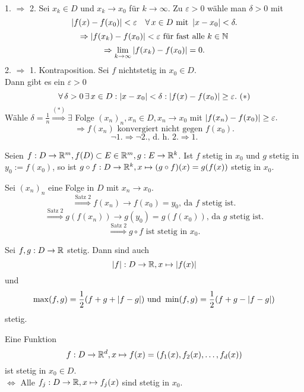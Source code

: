 \documentclass[../ana1.tex]{subfiles}
\begin{document}
\begin{bew}\leavevmode \\
    1. \(\Rightarrow \) 2. Sei \(x_k \in D \) und \( x_k 
    \rightarrow x_0 \) für \( k\rightarrow \infty \).
    Zu \( \varepsilon > 0 \) wähle man \( \delta > 0 \) mit
    \[ \left| f(x) - f(x_0) \right| < \varepsilon \quad \forall \, x\in D 
    \text{ mit } \left|x-x_0\right|<\delta. \]
    \[ \Rightarrow \left| f(x_k) - f(x_0) \right| < \varepsilon
    \text{ für fast alle } k\in\mathbb{N} \]
    \[ \Rightarrow \lim\limits_{k\rightarrow\infty} \left| f(x_k) - f(x_0) \right| = 0. \]
    2. \(\Rightarrow \) 1. Kontraposition. Sei \( f \) nichtstetig
    in \( x_0 \in D \).\\
    Dann gibt es ein \( \varepsilon > 0 \)
    \[ \forall \, \delta > 0 \,\exists \, x\in D : \left|x-x_0\right| 
    < \delta : \left| f(x) - f(x_0) \right| \geq \varepsilon.\ (*) \]
    Wähle \( \delta = \frac{1}{n} \overset{(*)}{\Rightarrow}
    \exists \) Folge \( {(x_n)}_n, x_n \in D, x_n \rightarrow x_0 \)
    mit \( \left| f(x_n) - f(x_0) \right| \geq \varepsilon. \)
    \[ \Rightarrow f(x_n) \text{ konvergiert nicht gegen } f(x_0). \]
    \[ \neg 1. \Rightarrow \neg 2.\text{, d.\ h.\ }2.\Rightarrow 1. \]
\end{bew}
\begin{satz}[Verkettung]
    Seien \( f:D\rightarrow \mathbb{R}^m, f(D) \subset E \in\mathbb{R}^m, 
    g: E\rightarrow\mathbb{R}^k \). Ist \( f \) stetig in \( x_0 \)
    und \( g \) stetig in \( y_0 := f(x_0) \), so ist 
    \( g \circ f : D\rightarrow \mathbb{R}^k, x \mapsto (g\circ f)(x) 
    = g(f(x)) \) stetig in \( x_0 \).
\end{satz}
\begin{bew}
    Sei \( {(x_n)}_n \) eine Folge in \( D \) mit 
    \( x_n \rightarrow x_0 \).
    \[ \overset{\text{Satz 2}}{\Rightarrow} f(x_n) \rightarrow f(x_0)
    = y_0 \text{, da } f \text{ stetig ist.} \]
    \[ \overset{\text{Satz 2}}{\Rightarrow} g(f(x_n))
    \rightarrow g(y_0) = g(f(x_0)) \text{, da } g \text{ stetig ist.} \]
    \[ \overset{\text{Satz 2}}{\Rightarrow} g\circ f 
    \text{ ist stetig in } x_0. \]
\end{bew}
\begin{bsp}
    Sei \( f,g : D\rightarrow \mathbb{R} \) stetig. Dann sind auch
    \[ \left|f\right| : D \rightarrow \mathbb{R}, x\mapsto \left|f(x)\right| \]
    und
    \[ \max(f,g) = \frac{1}{2} (f+g + \left|f-g\right|) \text{ und } \min(f,g) = \frac{1}{2} (f+g - \left|f-g\right| ) \]
    stetig.
\end{bsp}
\begin{lem}
    Eine Funktion \[ f: D\rightarrow \mathbb{R}^d, x\mapsto f(x) = (f_1(x), f_2(x), \dots , f_d(x)) \]
    ist stetig in  \(x_0 \in D\).\\
    \( \Leftrightarrow \) Alle  \( f_j : D \rightarrow \mathbb{R}, x\mapsto f_j(x) \) sind stetig in \( x_0 \).
\end{lem}
\end{document}
